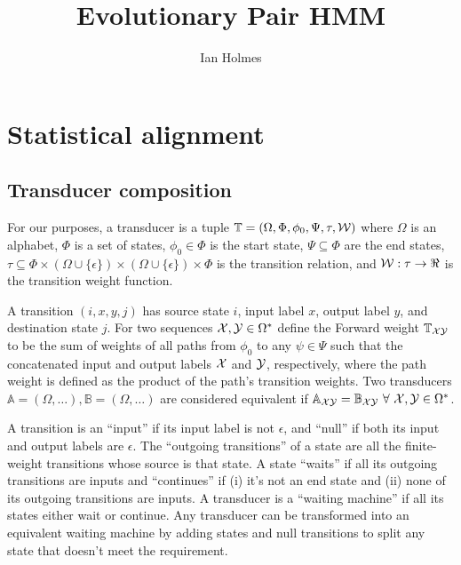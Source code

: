 \documentclass{article}
\title{Evolutionary Pair HMM}
\author{Ian Holmes}
\begin{document}

\section{Statistical alignment}

\subsection{Transducer composition}

\newcommand\gappedalphabet{(\Omega \cup \{\epsilon\})}

For our purposes, a transducer is a tuple
$\mathbb{T} = (\Omega, \Phi, \phi_0, \Psi, \tau, {\cal W})$
where
$\Omega$ is an alphabet,
$\Phi$ is a set of states,
$\phi_0 \in \Phi$ is the start state,
$\Psi \subseteq \Phi$ are the end states,
$\tau \subseteq \Phi \times \gappedalphabet \times \gappedalphabet \times \Phi$ is the transition relation, and
${\cal W}:\tau \to \Re$ is the transition weight function.

A transition $(i,x,y,j)$ has source state $i$, input label $x$, output label $y$, and destination state $j$.
For two sequences ${\cal X}, {\cal Y} \in \Omega^\ast$ define the Forward weight $\mathbb{T}_{\cal XY}$ to be the sum of weights of all paths from $\phi_0$ to any $\psi \in \Psi$
such that the concatenated input and output labels  ${\cal X}$ and ${\cal Y}$, respectively, where the path weight is defined as the product of the path's transition weights.
Two transducers $\mathbb{A}=(\Omega,\ldots), \mathbb{B}=(\Omega,\ldots)$ are considered equivalent if $\mathbb{A}_{\cal XY} = \mathbb{B}_{\cal XY}\ \forall\ {\cal X},{\cal Y} \in \Omega^\ast$.

A transition is an ``input'' if its input label is not $\epsilon$, and ``null'' if both its input and output labels are $\epsilon$.
The ``outgoing transitions'' of a state are all the finite-weight transitions whose source is that state.
A state ``waits'' if all its outgoing transitions are inputs
and ``continues'' if (i) it's not an end state and (ii) none of its outgoing transitions are inputs.
A transducer is a ``waiting machine'' if all its states either wait or continue.
Any transducer can be transformed into an equivalent waiting machine by adding states and null transitions to split any state that doesn't meet the requirement.
\end{document}
